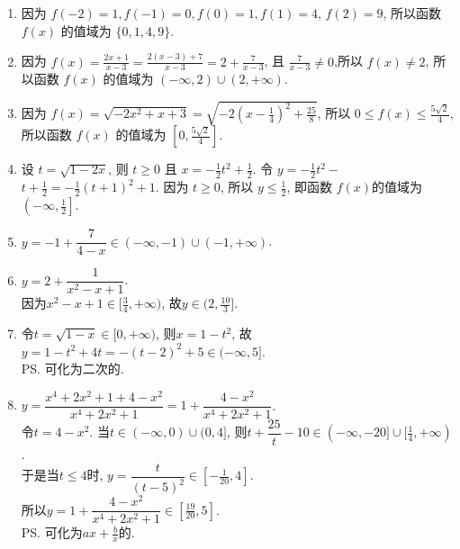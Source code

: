 \begin{enumerate}
\begin{jieda}
\begin{enumerate}
\item 因为 $f(-2)=1, f(-1)=0, f(0)=1, f(1)=4$, $f(2)=9$, 所以函数 $f(x)$ 的值域为 $\{0,1,4,9\}$.
\item 因为 $f(x)=\frac{2 x+1}{x-3}=\frac{2(x-3)+7}{x-3}=2+\frac{7}{x-3}$, 且 $\frac{7}{x-3} \neq 0$,所以 $f(x) \neq 2$, 所以函数 $f(x)$ 的值域为 $(-\infty, 2) \cup(2,+\infty)$. 
\item 因为 $f(x)=\sqrt{-2 x^2+x+3}=\sqrt{-2\left(x-\frac{1}{4}\right)^2+\frac{25}{8}}$, 所以 $0 \leqslant f(x) \leqslant \frac{5 \sqrt{2}}{4}$, 所以函数 $f(x)$ 的值域为 $\left[0, \frac{5 \sqrt{2}}{4}\right]$.
\item 设 $t=\sqrt{1-2 x}$, 则 $t \geqslant 0$ 且 $x=-\frac{1}{2} t^2+\frac{1}{2}$. 令 $y=-\frac{1}{2} t^2-$ $t+\frac{1}{2}=-\frac{1}{2}(t+1)^2+1$. 因为 $t \geqslant 0$, 所以 $y \leqslant \frac{1}{2}$, 即函数 $f(x)$的值域为 $\left(-\infty, \frac{1}{2}\right]$.

\item $y=-1+\dfrac{7}{4-x}\in(-\infty,-1)\cup(-1,+\infty)$. 

\item $y=2+\dfrac{1}{x^2-x+1}$. \\
因为$x^2-x+1\in[\frac{3}{4},+\infty)$, 故$y\in(2,\frac{10}{3}]$. 

\item 令$t=\sqrt{1-x}\in[0,+\infty)$, 则$x=1-t^2$, 故$y=1-t^2+4t=-(t-2)^2+5\in(-\infty,5]$. \\
\ps 可化为二次的. 

\item $y=\dfrac{x^4+2x^2+1+4-x^2}{x^4+2x^2+1}=1+\dfrac{4-x^2}{x^4+2x^2+1}$. \\
令$t=4-x^2$. 当$t\in(-\infty,0)\cup(0,4]$, 则$t+\dfrac{25}{t}-10\in(-\infty,-20]\cup[\frac{1}{4},+\infty)$. \\
于是当$t\leq 4$时, $y=\dfrac{t}{(t-5)^2}\in[-\frac{1}{20},4]$. \\
所以$y=1+\dfrac{4-x^2}{x^4+2x^2+1}\in[\frac{19}{20},5]$. \\
\ps 可化为$ax+\frac{b}{x}$的. 


\end{enumerate}
\end{jieda}
\end{enumerate}
